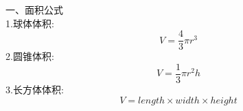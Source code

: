 \documentclass[UTF8, fontset=ubuntu]{ctexart}
\begin{document}
一、面积公式\\
1.球体体积:\\
\[V=\frac{4}{3}\pi r^3\]
2.圆锥体积:\\
\[V=\frac{1}{3}\pi r^2h\]
3.长方体体积:\\
\[V=length\times width\times height\]
\end{document}
